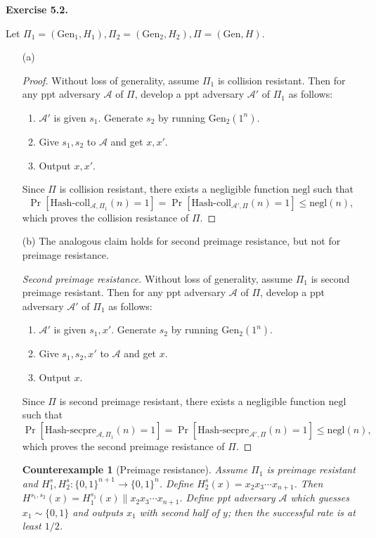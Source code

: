 \documentclass[a4paper]{article}
\newtheorem*{proof}{Proof}
\newtheorem*{counterexample}{Counterexample}
\newenvironment{exercise}[1]{
	\par
	\noindent\textbf{Exercise #1.}\quad
}{
	\par
	\bigskip
}
\newcommand{\sbra}[1]{\left[ #1 \right]}
\newcommand{\bin}{\{0,1\}}
\newcommand{\Gen}{\mathrm{Gen}}
\newcommand{\Hashcoll}{\mathrm{Hash}\text{-}\mathrm{coll}}
\newcommand{\negl}{\mathrm{negl}}
\newcommand{\ppt}{{\sc ppt} }
\newcommand{\Acal}{\mathcal{A}}
\begin{document}
\begin{exercise}{5.2}
    Let $\Pi_1=(\Gen_1,H_1),\Pi_2=(\Gen_2,H_2),\Pi=(\Gen,H)$.
\begin{enumerate}
\item[(a)]
    \begin{proof}
        Without loss of generality, assume $\Pi_1$ is collision resistant.
        Then for any \ppt adversary $\Acal$ of $\Pi$, develop a \ppt adversary $\Acal'$ of $\Pi_1$ as follows:
        \begin{enumerate}
            \item $\Acal'$ is given $s_1$. Generate $s_2$ by running $\Gen_2(1^n)$.
            \item Give $s_1,s_2$ to $\Acal$ and get $x,x'$.
            \item Output $x,x'$.
        \end{enumerate}
        Since $\Pi$ is collision resistant, there exists a negligible function $\negl$ such that
        $$
        \Pr\sbra{\Hashcoll_{\Acal,\Pi_1}(n)=1}=\Pr\sbra{\Hashcoll_{\Acal',\Pi}(n)=1}\leq\negl(n),
        $$
        which proves the collision resistance of $\Pi$.
    \end{proof}
\item[(b)] The analogous claim holds for second preimage resistance, but not for preimage resistance.
    \begin{proof}[Second preimage resistance]
        Without loss of generality, assume $\Pi_1$ is second preimage resistant.
        Then for any \ppt adversary $\Acal$ of $\Pi$, develop a \ppt adversary $\Acal'$ of $\Pi_1$ as follows:
        \begin{enumerate}
            \item $\Acal'$ is given $s_1,x'$. Generate $s_2$ by running $\Gen_2(1^n)$.
            \item Give $s_1,s_2,x'$ to $\Acal$ and get $x$.
            \item Output $x$.
        \end{enumerate}
        Since $\Pi$ is second preimage resistant, there exists a negligible function $\negl$ such that
        $$
        \Pr\sbra{\mathrm{Hash\text{-}secpre}_{\Acal,\Pi_1}(n)=1}
        =\Pr\sbra{\mathrm{Hash\text{-}secpre}_{\Acal',\Pi}(n)=1}\leq\negl(n),
        $$
        which proves the second preimage resistance of $\Pi$.
    \end{proof}
    \begin{counterexample}[Preimage resistance]
        Assume $\Pi_1$ is preimage resistant and $H_1^s,H_2^s:\bin^{n+1}\to\bin^n$.
        Define $H_2^s(x)=x_2x_3\cdots x_{n+1}$. Then $H^{s_1,s_2}(x)=H_1^{s_1}(x)\|x_2x_3\cdots x_{n+1}$.
        Define \ppt adversary $\Acal$ which guesses $x_1\sim\bin$ and outputs $x_1$ with second half of $y$; 
        then the successful rate is at least $1/2$.
    \end{counterexample}
\end{enumerate}
\end{exercise}
\end{document}
